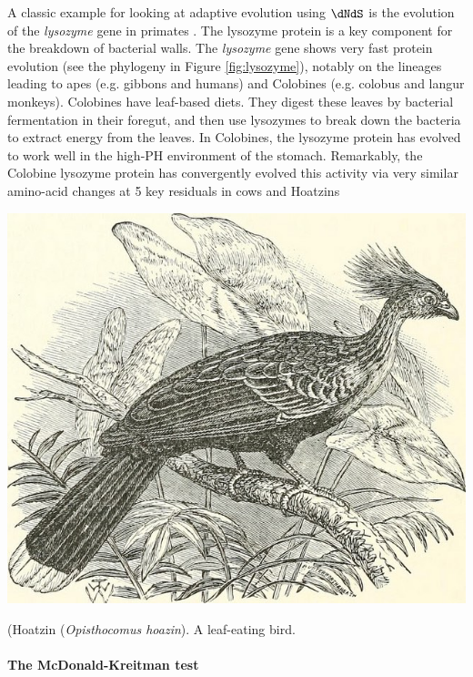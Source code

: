 A classic example for looking at adaptive evolution using $\dNdS$ is the
evolution of the {\it lysozyme} gene in primates \citep{Messier:97,Yang:98}. The lysozyme protein is
a key component for the breakdown of bacterial walls. The {\it lysozyme} gene shows very
fast protein evolution (see
the phylogeny in Figure \ref{fig:lysozyme}), notably on the lineages leading to apes (e.g. gibbons
and humans) and Colobines (e.g. colobus and langur monkeys). Colobines have leaf-based diets. They digest
these leaves by bacterial fermentation in their foregut, and then use lysozymes to break down the bacteria to extract energy from the
leaves. In Colobines, the lysozyme protein has evolved to work well in the high-PH environment of the stomach. Remarkably, the Colobine
lysozyme protein has convergently evolved this activity via very similar amino-acid changes at 5 key residuals in cows and Hoatzins \citep[a leaf
eating bird,][]{kornegay1994molecular}
\begin{marginfigure}
\begin{center}
\includegraphics[width=0.8  \textwidth]{illustration_images/Genetic_drift/Hoatzin/14747388314_85798ba97e_z.jpg}
\end{center}
\caption{ (Hoatzin ({\it Opisthocomus hoazin}). A leaf-eating bird. } \label{fig:hoatzin}
\end{marginfigure}
\paragraph{The McDonald-Kreitman test}

